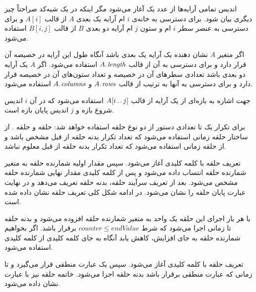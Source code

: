 
اندیس تمامی آرایه‌ها از عدد یک آغاز می‌شود مگر اینکه در یک شبه‌کد صراحتاً چیز دیگری بیان شود. برای دسترسی به خانه‌‌ی {$i$} ام آرایه یک بعدی {$A$} از قالب {$A[i]$} و برای دسترسی به عنصر سطر {$i$} ام و ستون {$j$} ام آرایه دو بعدی {$B$} از قالب {$B[i,j]$} استفاده می‌شود. 

اگر متغیر {$A$} نشان دهنده یک آرایه یک بعدی باشد آنگاه طول این آرایه در خصیصه {} آن قرار دارد و برای دسترسی به آن از قالب {$A.\hspace*{1pt}\mathit{length}$} استفاده می‌شود. اگر {$A$} یک آرایه دو بعدی باشد تعدادی سطرهای آن در خصیصه {} و تعداد ستون‌های آن در خصیصه {} قرار دارد و برای دسترسی به آنها به ترتیب از قالب {$A.\hspace*{1pt}\mathit{rows}$} و {$A.\hspace*{1pt}\mathit{columns}$} استفاده می‌شود. 

جهت اشاره به بازه‌ای از یک آرایه از قالب {$A[i\mathinner{\ldotp\ldotp} j]$} استفاده می‌شود که در آن {$i$} اندیس شروع بازه و {$j$} اندیس پایان بازه است.


برای تکرار یک تا تعدادی دستور از دو نوع حلقه استفاده خواهد شد: حلقه {} و حلقه {}. از ساختار حلقه {} زمانی استفاده می‌شود که تعداد تکرار بدنه حلقه از قبل مشخص باشد و از حلقه {} زمانی استفاده می‌شود که تعداد تکرار بدنه حلقه از قبل معلوم نباشد.

تعریف حلقه {} با کلمه کلیدی {} آغاز می‌شود. سپس مقدار اولیه شمارنده حلقه به متغیر شمارنده حلقه انتساب داده می‌شود و پس از کلمه کلیدی {} مقدار نهایی شمارنده حلقه مشخص می‌شود. بعد از تعریف سرآیند حلقه، بدنه حلقه تعریف می‌دهد و در نهایت عبارت {} پایان حلقه را نشان می‌شود. در ادامه شکل کلی تعریف حلقه {} نشان داده شده است.

\begin{latin}
\begin{algorithmic}[1]
	\State	{}
\EndFor
\end{algorithmic}
\end{latin}

با هر بار اجرای این حلقه یک واحد به متغیر شمارنده حلقه افزوده می‌شود و بدنه حلقه تا زمانی اجرا می‌شود که شرط {$\mathit{counter} \leqslant \mathit{endValue}$} برقرار باشد. اگر بخواهیم شمارنده حلقه به جای افزایش، کاهش یابد آنگاه به جای کلمه کلیدی {} از کلمه کلیدی {} استفاده می‌شود.

تعریف حلقه {} با کلمه کلیدی {} آغاز می‌شود. سپس یک عبارت منطقی قرار می‌گیرد و تا زمانی که عبارت منطقی برقرار باشد بدنه حلقه اجرا می‌شود. خاتمه حلقه {} نیز با عبارت {} نشان داده می‌شود.

